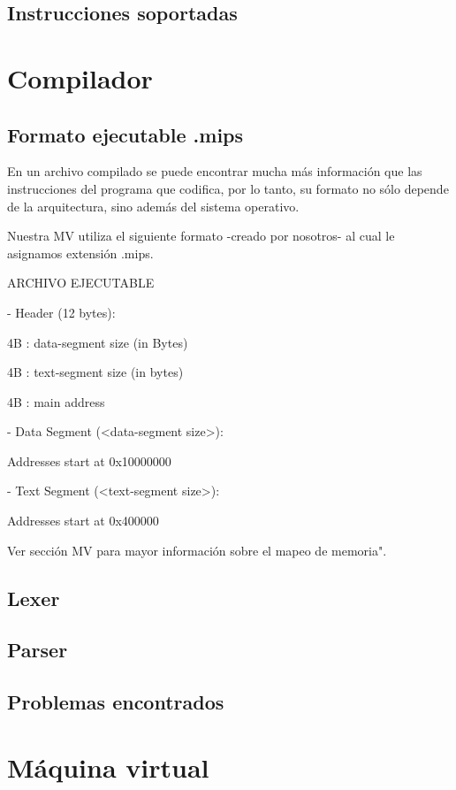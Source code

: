 \documentclass[12pt]{article}
\begin{document}
\subsection{Instrucciones soportadas}
    
\section{Compilador}
\subsection{Formato ejecutable .mips}

En un archivo compilado se puede encontrar mucha más información que las instrucciones del programa que codifica, por lo tanto, su formato no sólo depende de la arquitectura, sino además del sistema operativo.

Nuestra MV utiliza el siguiente formato -creado por nosotros- al cual le asignamos extensión .mips.


ARCHIVO EJECUTABLE

- Header (12 bytes):

    4B : data-segment size (in Bytes)

    4B : text-segment size (in bytes)

    4B : main address

- Data Segment (<data-segment size>):

    Addresses start at 0x10000000

- Text Segment (<text-segment size>):

    Addresses start at 0x400000

Ver sección MV para mayor información sobre el mapeo de memoria".

\subsection{Lexer}
\subsection{Parser}
\subsection{Problemas encontrados}
    
   
\section{Máquina virtual}
\end{document}
